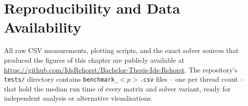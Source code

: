 \section{Reproducibility and Data Availability}
\label{sec:results_data}
All raw CSV measurements, plotting scripts, and the exact solver
sources that produced the figures of this chapter are publicly
available at \url{https://github.com/IdsRehorst/Bachelor-Thesis-Ids-Rehorst}.
The repository’s \texttt{tests/} directory contains
\texttt{benchmark\_\(<p>\).csv} files – one per thread count – that hold  
the median run time of every matrix and solver variant,  
ready for independent analysis or alternative visualisations.

